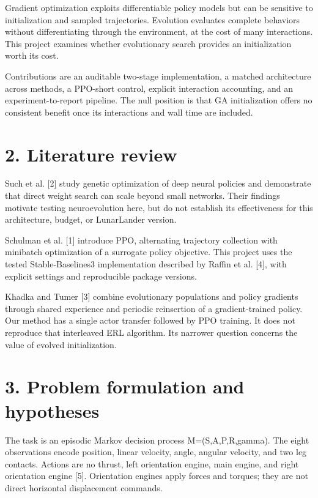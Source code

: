 \documentclass[11pt,a4paper]{article}
\begin{document}
Gradient optimization exploits differentiable policy models but can be sensitive to initialization and sampled trajectories. Evolution evaluates complete behaviors without differentiating through the environment, at the cost of many interactions. This project examines whether evolutionary search provides an initialization worth its cost.

Contributions are an auditable two-stage implementation, a matched architecture across methods, a PPO-short control, explicit interaction accounting, and an experiment-to-report pipeline. The null position is that GA initialization offers no consistent benefit once its interactions and wall time are included.

\section*{2. Literature review}
Such et al. [2] study genetic optimization of deep neural policies and demonstrate that direct weight search can scale beyond small networks. Their findings motivate testing neuroevolution here, but do not establish its effectiveness for this architecture, budget, or LunarLander version.

Schulman et al. [1] introduce PPO, alternating trajectory collection with minibatch optimization of a surrogate policy objective. This project uses the tested Stable-Baselines3 implementation described by Raffin et al. [4], with explicit settings and reproducible package versions.

Khadka and Tumer [3] combine evolutionary populations and policy gradients through shared experience and periodic reinsertion of a gradient-trained policy. Our method has a single actor transfer followed by PPO training. It does not reproduce that interleaved ERL algorithm. Its narrower question concerns the value of evolved initialization.

\section*{3. Problem formulation and hypotheses}
The task is an episodic Markov decision process M=(S,A,P,R,gamma). The eight observations encode position, linear velocity, angle, angular velocity, and two leg contacts. Actions are no thrust, left orientation engine, main engine, and right orientation engine [5]. Orientation engines apply forces and torques; they are not direct horizontal displacement commands.
\end{document}
